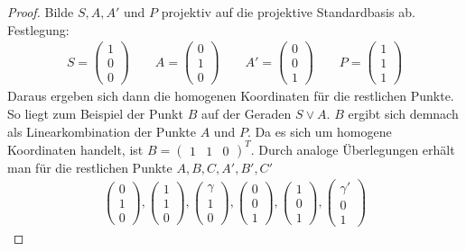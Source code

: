   \begin{proof}
    Bilde $S, A, A'$ und $P$ projektiv auf die projektive Standardbasis ab. Festlegung:
    \begin{align*}
      S  =  \begin{pmatrix} 1 \\ 0 \\ 0 \end{pmatrix} \qquad 
      A  =  \begin{pmatrix} 0 \\ 1 \\ 0 \end{pmatrix} \qquad    
      A' =  \begin{pmatrix} 0 \\ 0 \\ 1 \end{pmatrix} \qquad
      P  =  \begin{pmatrix} 1 \\ 1 \\ 1 \end{pmatrix}
    \end{align*}
    Daraus ergeben sich dann die homogenen Koordinaten für die restlichen Punkte. So liegt zum Beispiel der Punkt $B$ auf 
    der Geraden $S \vee A$. $B$ ergibt sich demnach als Linearkombination der Punkte $A$ und $P$. Da es sich um homogene 
    Koordinaten handelt, ist $B=\begin{pmatrix} 1 & 1 & 0 \end{pmatrix}^T$. Durch analoge Überlegungen erhält man für die 
    restlichen Punkte $A,B,C,A',B',C'$
    \begin{align*}
      \begin{pmatrix} 0 \\ 1 \\ 0 \end{pmatrix}, 
      \begin{pmatrix} 1 \\ 1 \\ 0 \end{pmatrix}, 
      \begin{pmatrix} \gamma  \\ 1 \\ 0 \end{pmatrix}, 
      \begin{pmatrix} 0 \\ 0 \\ 1 \end{pmatrix}, 
      \begin{pmatrix} 1 \\ 0 \\ 1 \end{pmatrix}, 
      \begin{pmatrix} \gamma' \\ 0 \\ 1 \end{pmatrix}
    \end{align*}
    

\end{proof}
